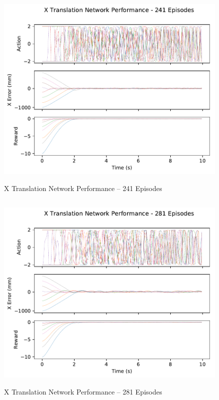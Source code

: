 \begin{figure}[H]
	\centering
	\includegraphics[width=6in, height=3.85in, keepaspectratio]{figures/train_figs/transx_transitions/1_241.pdf}
	\caption{X Translation Network Performance -- 241 Episodes}
\end{figure}
\begin{figure}[H]
	\centering
	\includegraphics[width=6in, height=3.85in, keepaspectratio]{figures/train_figs/transx_transitions/1_281.pdf}
	\caption{X Translation Network Performance -- 281 Episodes}
\end{figure}
